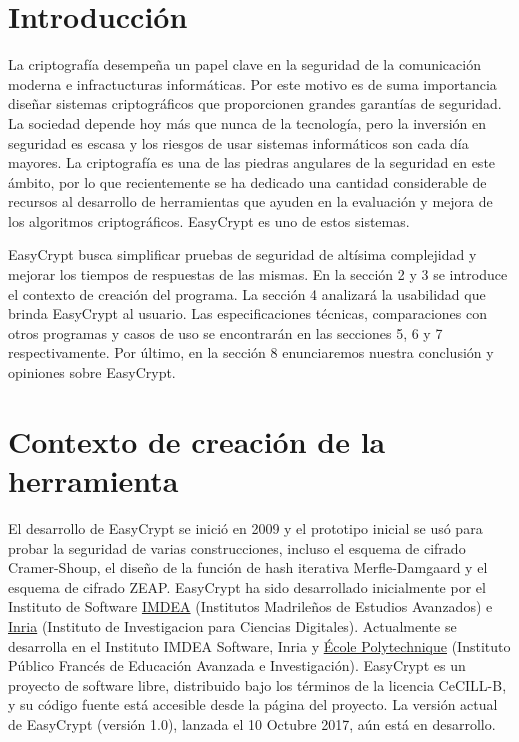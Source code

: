 \documentclass[runningheads,a4paper]{llncs}
\begin{document}
\section{Introducción}
La criptografía desempeña un papel clave en la seguridad de la comunicación moderna e infractucturas informáticas.  Por este motivo es de suma importancia diseñar sistemas criptográficos que proporcionen grandes garantías de seguridad.
La sociedad depende hoy más que nunca de la tecnología, pero la inversión en seguridad es escasa y los riesgos de usar sistemas informáticos son cada día mayores. La criptografía es una de las piedras angulares de la seguridad en este  ámbito, por lo que recientemente se ha dedicado una cantidad considerable de recursos al desarrollo de herramientas que ayuden en la evaluación y mejora de los algoritmos criptográficos. EasyCrypt es uno de estos sistemas.

EasyCrypt busca simplificar pruebas de seguridad de altísima complejidad y mejorar los tiempos de respuestas de las mismas. En la sección 2 y 3 se introduce el contexto de creación del programa. La sección 4 analizará la usabilidad que brinda EasyCrypt al usuario. Las especificaciones técnicas, comparaciones con otros programas y casos de uso se encontrarán en las secciones 5, 6 y 7 respectivamente. Por último, en la sección 8 enunciaremos nuestra conclusión y opiniones sobre EasyCrypt.
    
\section{Contexto de creación de la herramienta}
El desarrollo de EasyCrypt se inició en 2009 y el prototipo inicial se usó para probar la seguridad de varias construcciones, incluso el esquema de cifrado Cramer-Shoup, el diseño de la función de hash iterativa Merfle-Damgaard y el esquema de cifrado ZEAP. EasyCrypt ha sido desarrollado inicialmente por el Instituto de Software \href{http://www.imdea.org/es}{IMDEA} (Institutos Madrileños de Estudios Avanzados) e \href{https://www.inria.fr/en/}{Inria} (Instituto de Investigacion para Ciencias Digitales). Actualmente se desarrolla en el Instituto IMDEA Software, Inria y \href{https://www.polytechnique.edu/}{École Polytechnique} (Instituto Público Francés de Educación Avanzada e Investigación). EasyCrypt es un proyecto de software libre, distribuido bajo los términos de la licencia CeCILL-B, y su código fuente está accesible desde la página del proyecto. 
La versión actual de EasyCrypt (versión 1.0), lanzada el 10 Octubre 2017, aún está en desarrollo. 
\cite{article2}
\end{document}
